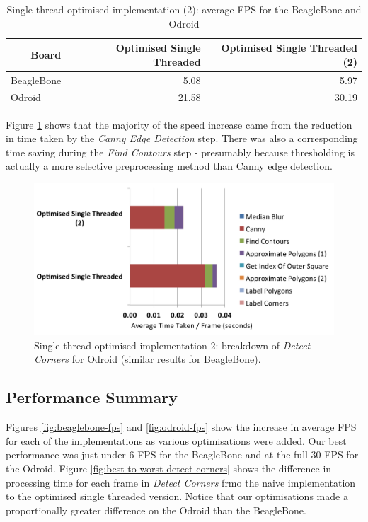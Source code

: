 \documentclass{acm_proc_article-sp}
\begin{document}
\begin{table}[htbp]
  \centering
    \begin{tabular}{rrr}
    \toprule
    \textbf{Board} & \textbf{Optimised Single Threaded} & \textbf{Optimised Single Threaded (2)} \\
    \midrule
    \multicolumn{1}{l}{BeagleBone} & 5.08  & 5.97 \\
    \multicolumn{1}{l}{Odroid} & 21.58 & 30.19 \\
    \bottomrule
    \end{tabular}%
  \caption{Single-thread optimised implementation (2): average FPS for the BeagleBone and Odroid}%
  \label{tab:single-threaded-optimisation-2-fps}%
\end{table}%

Figure \ref{fig:single-opt-2-breakdown-detect-corners} shows that the majority of the speed increase came from the reduction in time taken by the \textit{Canny Edge Detection} step. There was also a corresponding time saving during the \textit{Find Contours} step - presumably because thresholding is actually a more selective preprocessing method than Canny edge detection.

\begin{figure}[htbp]
\centering
\includegraphics[width=\textwidth]{images/performance/single-opt-2-breakdown-detect-corners.png}
\caption{Single-thread optimised implementation 2: breakdown of \textit{Detect Corners} for Odroid (similar results for BeagleBone).}
\label{fig:single-opt-2-breakdown-detect-corners}
\end{figure}

\subsection{Performance Summary}
Figures \ref{fig:beaglebone-fps} and \ref{fig:odroid-fps} show the increase in average FPS for each of the implementations as various optimisations were added. Our best performance was just under 6 FPS for the BeagleBone and at the full 30 FPS for the Odroid. Figure \ref{fig:best-to-worst-detect-corners} shows the difference in processing time for each frame in \textit{Detect Corners} frmo the naive implementation to the optimised single threaded version. Notice that our optimisations made a proportionally greater difference on the Odroid than the BeagleBone.
\end{document}
